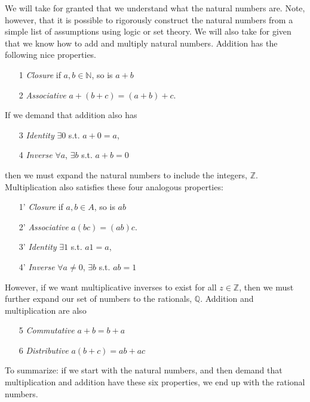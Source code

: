 \documentclass[12pt,reqno]{amsart}
\theoremstyle{definition}
\begin{document}
We will take for granted that we understand what the natural numbers
are. Note, however, that it is possible to rigorously construct the
natural numbers from a simple list of assumptions using logic or set
theory. We will also take for given that we know how to add and
multiply natural numbers. Addition has the following nice properties.
\begin{itemize}
\item[1] \emph{Closure} if $a, b \in \mathbb{N}$, so is $a + b$ 
\item[2] \emph{Associative} $a + (b + c) = (a + b) + c$. 
\end{itemize}
If we demand that addition also has 
\begin{itemize}
\item[3] \emph{Identity} $\exists 0$ s.t. $a + 0 = a$,
\item[4] \emph{Inverse} $\forall a$, $\exists b$ s.t. $a + b = 0$
\end{itemize}
then we must expand the natural numbers to include the integers,
$\mathbb{Z}$. Multiplication also satisfies these four analogous
properties:
\begin{itemize}
\item[1'] \emph{Closure} if $a, b \in A$, so is $ab$ 
\item[2'] \emph{Associative} $a (b c) = (a b)  c$. 
\item[3'] \emph{Identity} $\exists 1$ s.t. $a 1= a$,
\item[4'] \emph{Inverse} $\forall a \neq 0$, $\exists b$ s.t. $ab = 1$
\end{itemize}
However, if we want multiplicative inverses to exist for all $z\in
\mathbb{Z}$, then we must further expand our set of numbers to the
rationals, $\mathbb{Q}$. Addition and multiplication are also
\begin{itemize}
\item[5] \emph{Commutative} $ a + b = b + a$
\item[6] \emph{Distributive} $a (b + c) = ab + ac$
\end{itemize}
To summarize: if we start with the natural numbers, and then demand
that multiplication and addition have these six properties, we end up
with the rational numbers. 
\end{document}
